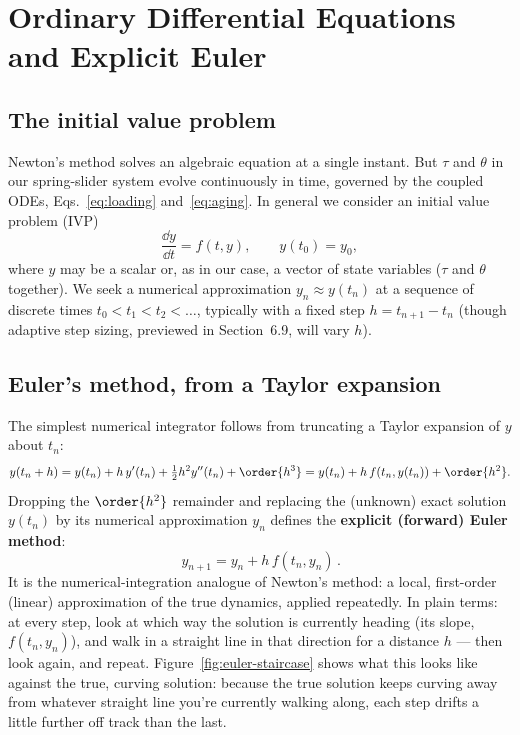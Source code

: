 \section{Ordinary Differential Equations and Explicit Euler}

\subsection{The initial value problem}

Newton's method solves an algebraic equation at a single instant. But $\tau$ and $\theta$ in our spring-slider system evolve continuously in time, governed by the coupled ODEs, Eqs.~\eqref{eq:loading} and~\eqref{eq:aging}. In general we consider an initial value problem (IVP)
\begin{equation}
\frac{\dd y}{\dd t} = f(t, y), \qquad y(t_0) = y_0,
\label{eq:ivp}
\end{equation}
where $y$ may be a scalar or, as in our case, a vector of state variables ($\tau$ and $\theta$ together). We seek a numerical approximation $y_n \approx y(t_n)$ at a sequence of discrete times $t_0 < t_1 < t_2 < \dots$, typically with a fixed step $h = t_{n+1}-t_n$ (though adaptive step sizing, previewed in Section~6.9, will vary $h$).

\subsection{Euler's method, from a Taylor expansion}

The simplest numerical integrator follows from truncating a Taylor expansion of $y$ about $t_n$:
\begin{equation}
y(t_n + h) = y(t_n) + h\,y'(t_n) + \tfrac{1}{2}h^2 y''(t_n) + \order{h^3} = y(t_n) + h\,f(t_n, y(t_n)) + \order{h^2}.
\end{equation}
Dropping the $\order{h^2}$ remainder and replacing the (unknown) exact solution $y(t_n)$ by its numerical approximation $y_n$ defines the \textbf{explicit (forward) Euler method}:
\begin{equation}
\boxed{\, y_{n+1} = y_n + h\, f(t_n, y_n) \,}.
\label{eq:euler}
\end{equation}
It is the numerical-integration analogue of Newton's method: a local, first-order (linear) approximation of the true dynamics, applied repeatedly. In plain terms: at every step, look at which way the solution is currently heading (its slope, $f(t_n,y_n)$), and walk in a straight line in that direction for a distance $h$ --- then look again, and repeat. Figure~\ref{fig:euler-staircase} shows what this looks like against the true, curving solution: because the true solution keeps curving away from whatever straight line you're currently walking along, each step drifts a little further off track than the last.

